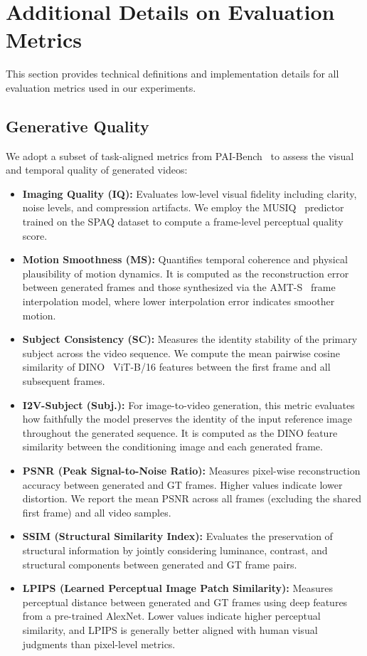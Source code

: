 \section{Additional Details on Evaluation Metrics}
\label{sec:metric}
This section provides technical definitions and implementation details for all evaluation metrics used in our experiments.      

\subsection{Generative Quality}
We adopt a subset of task-aligned metrics from PAI-Bench~\citep{zhou2025pai} to assess the visual and temporal quality of generated videos:
\begin{itemize}[labelsep=0.6em, leftmargin=1.2em,itemindent=0em]
\item \textbf{Imaging Quality (IQ):} Evaluates low-level visual fidelity including clarity, noise levels, and compression artifacts. We employ the MUSIQ~\citep{ke2021musiq} predictor trained on the SPAQ dataset to compute a frame-level perceptual quality score.
\item \textbf{Motion Smoothness (MS):} Quantifies temporal coherence and physical plausibility of motion dynamics. It is computed as the reconstruction error between generated frames and those synthesized via the AMT-S~\citep{li2023amt} frame interpolation model, where lower interpolation error indicates smoother motion.
\item \textbf{Subject Consistency (SC):} Measures the identity stability of the primary subject across the video sequence. We compute the mean pairwise cosine similarity of DINO~\citep{zhang2022dino} ViT-B/16 features between the first frame and all subsequent frames.
\item \textbf{I2V-Subject (Subj.):} For image-to-video generation, this metric evaluates how faithfully the model preserves the identity of the input reference image throughout the generated sequence. It is computed as the DINO feature similarity between the conditioning image and each generated frame.  
\item \textbf{PSNR (Peak Signal-to-Noise Ratio):} Measures pixel-wise reconstruction accuracy between generated and GT frames. Higher values indicate lower distortion. We report the mean PSNR across all frames (excluding the shared first frame) and all video samples. 
\item \textbf{SSIM (Structural Similarity Index):} Evaluates the preservation of structural information by jointly considering luminance, contrast, and structural components between generated and GT frame pairs. 
\item \textbf{LPIPS (Learned Perceptual Image Patch Similarity):} Measures perceptual distance between generated and GT frames using deep features from a pre-trained AlexNet. Lower values indicate higher perceptual similarity, and LPIPS is generally better aligned with human visual judgments than pixel-level metrics. 
\end{itemize}                                                                                                  


